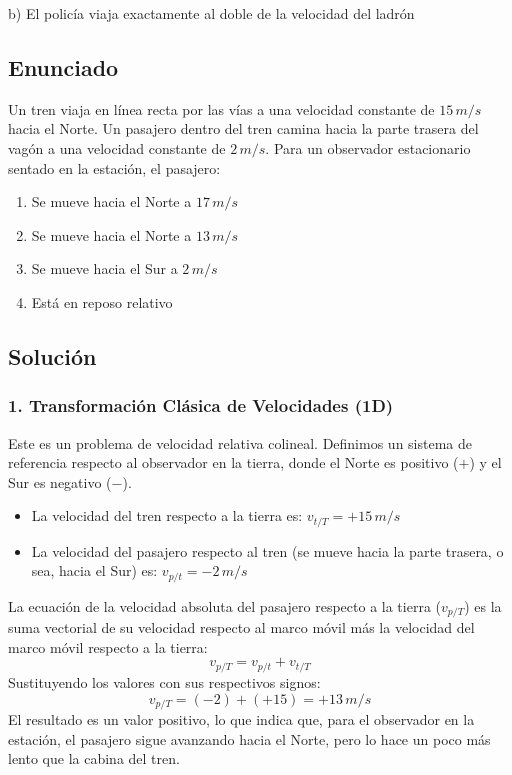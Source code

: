 \documentclass[12pt, a4paper]{article}
\begin{document}
\begin{tcolorbox}[colback=green!5!white, colframe=green!50!black, title=Respuesta Final]
\centering \Large b) El policía viaja exactamente al doble de la velocidad del ladrón
\end{tcolorbox}

\newpage

\subsection*{Enunciado}
Un tren viaja en línea recta por las vías a una velocidad constante de $15\,\si{m/s}$ hacia el Norte. Un pasajero dentro del tren camina hacia la parte trasera del vagón a una velocidad constante de $2\,\si{m/s}$. Para un observador estacionario sentado en la estación, el pasajero:
\begin{enumerate}[label=\alph*)]
    \item Se mueve hacia el Norte a $17\,\si{m/s}$
    \item Se mueve hacia el Norte a $13\,\si{m/s}$
    \item Se mueve hacia el Sur a $2\,\si{m/s}$
    \item Está en reposo relativo
\end{enumerate}

\subsection*{Solución}

\subsubsection*{1. Transformación Clásica de Velocidades (1D)}
Este es un problema de velocidad relativa colineal. Definimos un sistema de referencia respecto al observador en la tierra, donde el Norte es positivo ($+$) y el Sur es negativo ($-$).
\begin{itemize}
    \item La velocidad del tren respecto a la tierra es: $v_{t/T} = +15\,\si{m/s}$
    \item La velocidad del pasajero respecto al tren (se mueve hacia la parte trasera, o sea, hacia el Sur) es: $v_{p/t} = -2\,\si{m/s}$
\end{itemize}

La ecuación de la velocidad absoluta del pasajero respecto a la tierra ($v_{p/T}$) es la suma vectorial de su velocidad respecto al marco móvil más la velocidad del marco móvil respecto a la tierra:
$$ v_{p/T} = v_{p/t} + v_{t/T} $$
Sustituyendo los valores con sus respectivos signos:
$$ v_{p/T} = (-2) + (+15) = +13\,\si{m/s} $$
El resultado es un valor positivo, lo que indica que, para el observador en la estación, el pasajero sigue avanzando hacia el Norte, pero lo hace un poco más lento que la cabina del tren.
\end{document}
